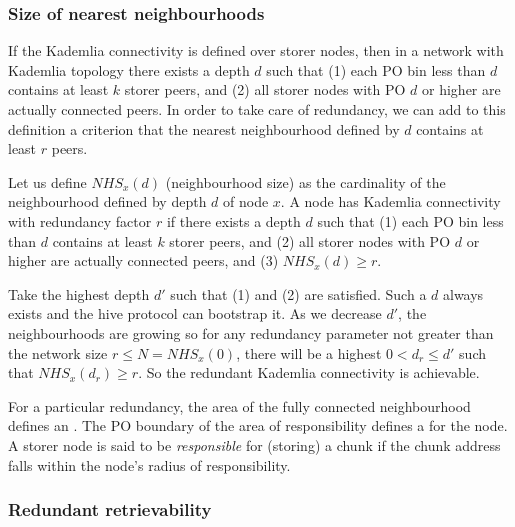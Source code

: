\subsubsection{Size of nearest neighbourhoods}

If the Kademlia connectivity is defined over storer nodes, then in a network with Kademlia topology there exists a depth $d$ such that (1) each PO bin less than $d$ contains at least $k$ storer peers, and (2) all storer nodes with PO $d$ or higher are actually connected peers. In order to take care of redundancy, we can add  to this definition a criterion that the nearest neighbourhood defined by $d$ contains at least $r$ peers.

Let us define $\mathit{NHS}_x(d)$ (neighbourhood size) as the cardinality of the neighbourhood defined by depth $d$ of node $x$. 
A  node has Kademlia connectivity with redundancy factor $r$ if there exists a depth $d$ such that (1) each PO bin less than $d$ contains at least $k$ storer peers, and (2) all storer nodes with PO $d$ or higher are actually connected peers, and (3) $\mathit{NHS}_x(d)\geq r$.

Take the highest depth $d'$ such that (1) and (2) are satisfied. Such a $d$ always exists and the hive protocol can bootstrap it. As we decrease $d'$, the neighbourhoods are growing so  for any redundancy parameter not greater than the network size $r\leq N=\mathit{NHS}_x(0)$, there will be a highest $0<d_r\leq d'$ such that $\mathit{NHS}_x(d_r)\geq r$. So the redundant Kademlia connectivity is achievable. 



For a particular redundancy, the area of the fully connected neighbourhood defines an . The PO boundary of the area of responsibility defines a  for the node. A storer node is said to be \emph{responsible} for (storing) a chunk if the chunk address falls within the node's radius of responsibility. 

\subsubsection{Redundant retrievability}

